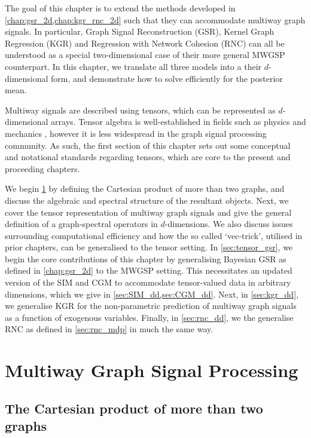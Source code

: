 The goal of this chapter is to extend the methods developed in \cref{chap:gsr_2d,chap:kgr_rnc_2d} such that they can accommodate multiway graph signals. In particular, Graph Signal Reconstruction (GSR), Kernel Graph Regression (KGR) and Regression with Network Cohesion (RNC) can all be understood as a special two-dimensional case of their more general MWGSP counterpart. In this chapter, we translate all three models into a their $d$-dimensional form, and demonstrate how to solve efficiently for the posterior mean.  


Multiway signals are described using tensors, which can be represented as $d$-dimensional arrays. Tensor algebra is well-established in fields such as physics and mechanics \citep{Renteln2013}, however it is less widespread in the graph signal processing community. As such, the first section of this chapter sets out some conceptual and notational standards regarding tensors, which are core to the present and proceeding chapters. 


We begin \cref{sec:dd_gsp} by defining the Cartesian product of more than two graphs, and discuss the algebraic and spectral structure of the resultant objects. Next, we cover the tensor representation of multiway graph signals and give the general definition of a graph-spectral operators in $d$-dimensions. We also discuss issues surrounding computational efficiency and how the so called `vec-trick', utilised in prior chapters, can be generalised to the tensor setting. In \cref{sec:tensor_gsr}, we begin the core contributions of this chapter by generalising Bayesian GSR as defined in \cref{chap:gsr_2d} to the MWGSP setting. This necessitates an updated version of the SIM and CGM to accommodate tensor-valued data in arbitrary dimensions, which we give in \cref{sec:SIM_dd,sec:CGM_dd}. Next, in \cref{sec:kgr_dd}, we generalise KGR for the non-parametric prediction of multiway graph signals as a function of exogenous variables. Finally, in \cref{sec:rnc_dd}, we the generalise RNC as defined in \cref{sec:rnc_mdp} in much the same way.  



\section{Multiway Graph Signal Processing}

\label{sec:dd_gsp}

\subsection{The Cartesian product of more than two graphs}

